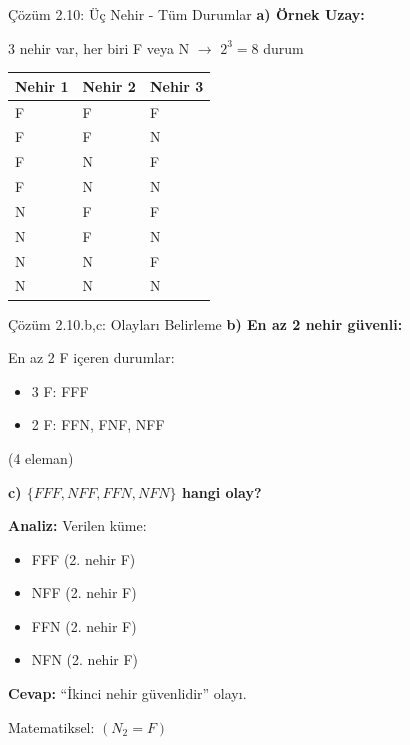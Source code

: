 \documentclass[light]{lutbeamer}
\begin{document}
\begin{frame}{Çözüm 2.10: Üç Nehir - Tüm Durumlar}
    \color{blue}
    \textbf{a) Örnek Uzay:}
    
    3 nehir var, her biri F veya N $\rightarrow$ $2^3 = 8$ durum
    
    \begin{center}
    \begin{tabular}{lll}
        Nehir 1 & Nehir 2 & Nehir 3 \\
        \hline
        F & F & F \\
        F & F & N \\
        F & N & F \\
        F & N & N \\
        N & F & F \\
        N & F & N \\
        N & N & F \\
        N & N & N \\
    \end{tabular}
    \end{center}
    
    \begin{center}
    \end{center}
\end{frame}

\begin{frame}{Çözüm 2.10.b,c: Olayları Belirleme}
    \color{blue}
    \textbf{b) En az 2 nehir güvenli:}
    
    En az 2 F içeren durumlar:
    \begin{itemize}
        \item 3 F: FFF
        \item 2 F: FFN, FNF, NFF
    \end{itemize}
    
    \begin{center}
     (4 eleman)
    \end{center}
    
    \vspace{0.5cm}
    \textbf{c) $\{FFF, NFF, FFN, NFN\}$ hangi olay?}
    
    \textbf{Analiz:} Verilen küme:
    \begin{itemize}
        \item FFF (2. nehir F)
        \item NFF (2. nehir F)
        \item FFN (2. nehir F)
        \item NFN (2. nehir F)
    \end{itemize}
    
    \textbf{Cevap:} ``İkinci nehir güvenlidir'' olayı.
    
    Matematiksel: $(N_2 = F)$
\end{frame}
\end{document}
